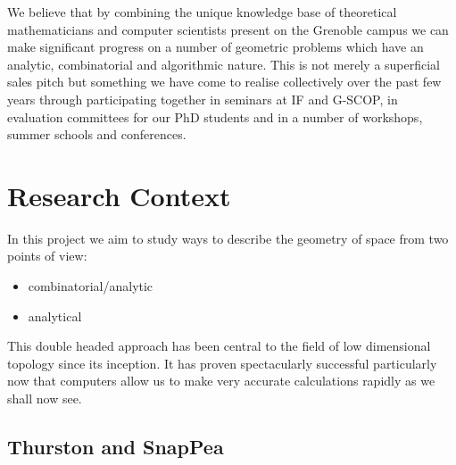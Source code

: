 \documentclass[14pt,fleqn]{article}
\begin{document}
We believe that by combining 
the unique knowledge base of theoretical
mathematicians and computer scientists
present on the Grenoble campus 
we can make significant progress 
on a number of geometric problems 
which have an analytic, combinatorial and algorithmic nature. 
This is not merely a superficial sales pitch 
but something we have come to realise collectively
over the past few years 
through participating together in seminars at IF and G-SCOP, in evaluation committees for our PhD students 
and in a number of workshops, summer schools and conferences.


\section{Research Context}

In this project we aim to study ways to describe the geometry of space from two points of view: 
\begin{itemize}
\item combinatorial/analytic
\item analytical
\end{itemize} 
This double headed approach has been central to the field of low dimensional topology since its inception.
It  has proven spectacularly successful 
particularly now that computers allow us 
to make very accurate calculations rapidly as we shall now see. 



\subsection{Thurston and SnapPea}
\end{document}
